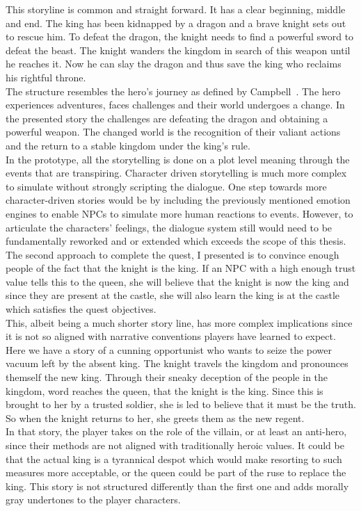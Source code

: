 This storyline is common and straight forward. It has a clear beginning, middle and end. The king has been kidnapped by a dragon and a brave knight sets out to rescue him. To defeat the dragon, the knight needs to find a powerful sword to defeat the beast. The knight wanders the kingdom in search of this weapon until he reaches it. Now he can slay the dragon and thus save the king who reclaims his rightful throne.\\
The structure resembles the hero's journey as defined by Campbell~\cite{Campbell2008}. The hero experiences adventures, faces challenges and their world undergoes a change. In the presented story the challenges are defeating the dragon and obtaining a powerful weapon. The changed world is the recognition of their valiant actions and the return to a stable kingdom under the king's rule.\\
In the prototype, all the storytelling is done on a plot level meaning through the events that are transpiring. Character driven storytelling is much more complex to simulate without strongly scripting the dialogue. One step towards more character-driven stories would be by including the previously mentioned emotion engines to enable NPCs to simulate more human reactions to events. However, to articulate the characters' feelings, the dialogue system still would need to be fundamentally reworked and or extended which exceeds the scope of this thesis.\\
The second approach to complete the quest, I presented is to convince enough people of the fact that the knight is the king. If an NPC with a high enough trust value tells this to the queen, she will believe that the knight is now the king and since they are present at the castle, she will also learn the king is at the castle which satisfies the quest objectives.\\
This, albeit being a much shorter story line, has more complex implications since it is not so aligned with narrative conventions players have learned to expect. Here we have a story of a cunning opportunist who wants to seize the power vacuum left by the absent king. The knight travels the kingdom and pronounces themself the new king. Through their sneaky deception of the people in the kingdom, word reaches the queen, that the knight is the king. Since this is brought to her by a trusted soldier, she is led to believe that it must be the truth. So when the knight returns to her, she greets them as the new regent.\\
In that story, the player takes on the role of the villain, or at least an anti-hero, since their methods are not aligned with traditionally heroic values. It could be that the actual king is a tyrannical despot which would make resorting to such measures more acceptable, or the queen could be part of the ruse to replace the king. This story is not structured differently than the first one and adds morally gray undertones to the player characters.\\
